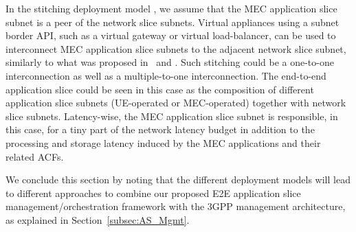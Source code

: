 In the stitching deployment model , we assume that the MEC application slice subnet is a peer of the network slice subnets. Virtual appliances using a subnet border API, such as a virtual gateway or virtual load-balancer, can be used to interconnect MEC application slice subnets to the adjacent network slice subnet, similarly to what was proposed in~\cite{2020_MNET_MEC_subslice} and \cite{2021_TNSM_e22_slice_survey}. Such stitching could be a one-to-one interconnection as well as a multiple-to-one interconnection. The end-to-end application slice could be seen in this case as the composition of different application slice subnets (UE-operated or MEC-operated) together with network slice subnets. Latency-wise, the MEC application slice subnet is responsible, in this case, for a tiny part of the network latency budget in addition to the processing and storage latency induced by the MEC applications and their related ACFs.
%
%

We conclude this section by noting that the different deployment models will lead to different approaches to combine our proposed E2E application slice management/orchestration framework with the 3GPP management architecture, as explained in Section~\ref{subsec:AS_Mgmt}.

%

